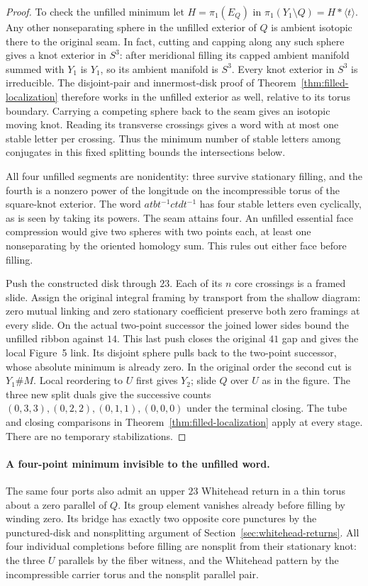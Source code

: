 \documentclass[11pt,letterpaper]{article}
\numberwithin{equation}{section}
\theoremstyle{remark}
\begin{document}
\begin{proof}
To check the unfilled minimum let \(H=\pi_1(E_Q)\) in
\(\pi_1(Y_1\setminus Q)=H*\langle t\rangle\).
Any other nonseparating sphere in the unfilled exterior of \(Q\)
is ambient isotopic there to the original seam. In fact, cutting and
capping along any such sphere gives a knot exterior in \(S^3\):
after meridional filling its capped ambient manifold summed with
\(Y_1\) is \(Y_1\), so its ambient manifold is \(S^3\).
Every knot exterior in \(S^3\) is irreducible. The disjoint-pair
and innermost-disk proof of Theorem~\ref{thm:filled-localization}
therefore works in the unfilled exterior as well, relative to its
torus boundary. Carrying a competing sphere back to the seam gives
an isotopic moving knot. Reading its transverse crossings gives a
word with at most one stable letter per crossing. Thus the minimum
number of stable letters among conjugates in this fixed splitting
bounds the intersections below.

All four unfilled segments are nonidentity: three survive stationary
filling, and the fourth is a nonzero power of the longitude on the
incompressible torus of the square-knot exterior. The word
\(a t b t^{-1} c t d t^{-1}\) has four stable letters even cyclically,
as is seen by taking its powers. The seam attains four.
An unfilled essential face compression would give two spheres with
two points each, at least one nonseparating by the oriented homology
sum. This rules out either face before filling.

Push the constructed disk through \(23\). Each of its \(n\) core
crossings is a framed slide. Assign the original integral framing by
transport from the shallow diagram: zero mutual linking and zero
stationary coefficient preserve both zero framings at every slide.
On the actual two-point successor the joined lower sides bound the
unfilled ribbon against \(14\). This last push closes the original
\(41\) gap and gives the local Figure~5 link. Its disjoint sphere
pulls back to the two-point successor, whose absolute minimum is
already zero. In the original order the second cut is \(Y_1\#M\).
Local reordering to \(U\) first gives \(Y_2\); slide \(Q\) over \(U\)
as in the figure. The three new split duals give the successive counts
\((0,3,3),(0,2,2),(0,1,1),(0,0,0)\) under the terminal closing.
The tube and closing comparisons in Theorem~\ref{thm:filled-localization}
apply at every stage. There are no temporary stabilizations.
\end{proof}

\paragraph{A four-point minimum invisible to the unfilled word.}
The same four ports also admit an upper \(23\) Whitehead return in a
thin torus about a zero parallel of \(Q\). Its group element vanishes
already before filling by winding zero. Its bridge has exactly two
opposite core punctures by the punctured-disk and nonsplitting argument
of Section~\ref{sec:whitehead-returns}. All four individual completions
before filling are nonsplit from their stationary knot: the three \(U\)
parallels by the fiber witness, and the Whitehead pattern by the
incompressible carrier torus and the nonsplit parallel pair.
\end{document}
